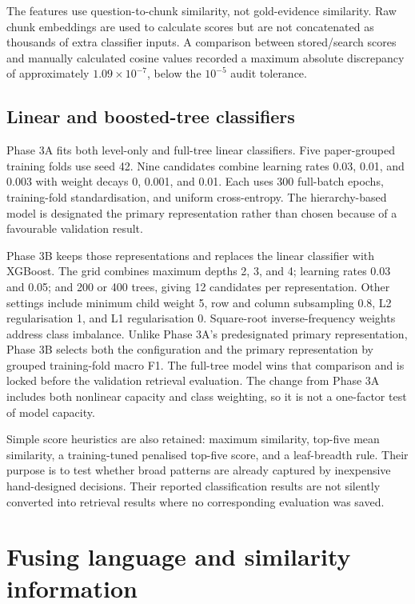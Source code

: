 The features use question-to-chunk similarity, not gold-evidence
similarity. Raw chunk embeddings are used to calculate scores but are
not concatenated as thousands of extra classifier inputs. A comparison
between stored/search scores and manually calculated cosine values
recorded a maximum absolute discrepancy of approximately
$1.09\times10^{-7}$, below the $10^{-5}$ audit tolerance.

\subsection{Linear and boosted-tree classifiers}
Phase 3A fits both level-only and full-tree linear classifiers. Five
paper-grouped training folds use seed 42. Nine candidates combine
learning rates 0.03, 0.01, and 0.003 with weight decays 0, 0.001, and
0.01. Each uses 300 full-batch epochs, training-fold standardisation,
and uniform cross-entropy. The hierarchy-based model is designated
the primary representation rather than chosen because of a favourable
validation result.

Phase 3B keeps those representations and replaces the linear classifier
with XGBoost. The grid combines maximum depths 2, 3, and 4; learning
rates 0.03 and 0.05; and 200 or 400 trees, giving 12 candidates per
representation. Other settings include minimum child weight 5,
row and column subsampling 0.8, L2 regularisation 1, and L1
regularisation 0. Square-root inverse-frequency weights address
class imbalance. Unlike Phase 3A's predesignated primary representation,
Phase 3B selects both the configuration and the primary representation
by grouped training-fold macro F1. The full-tree model wins that
comparison and is locked before the validation retrieval evaluation.
The change from Phase 3A includes both nonlinear capacity and class
weighting, so it is not a one-factor test of model capacity.

Simple score heuristics are also retained: maximum similarity,
top-five mean similarity, a training-tuned penalised top-five score,
and a leaf-breadth rule. Their purpose is to test whether broad
patterns are already captured by inexpensive hand-designed decisions.
Their reported classification results are not silently converted into
retrieval results where no corresponding evaluation was saved.

\section{Fusing language and similarity information}
